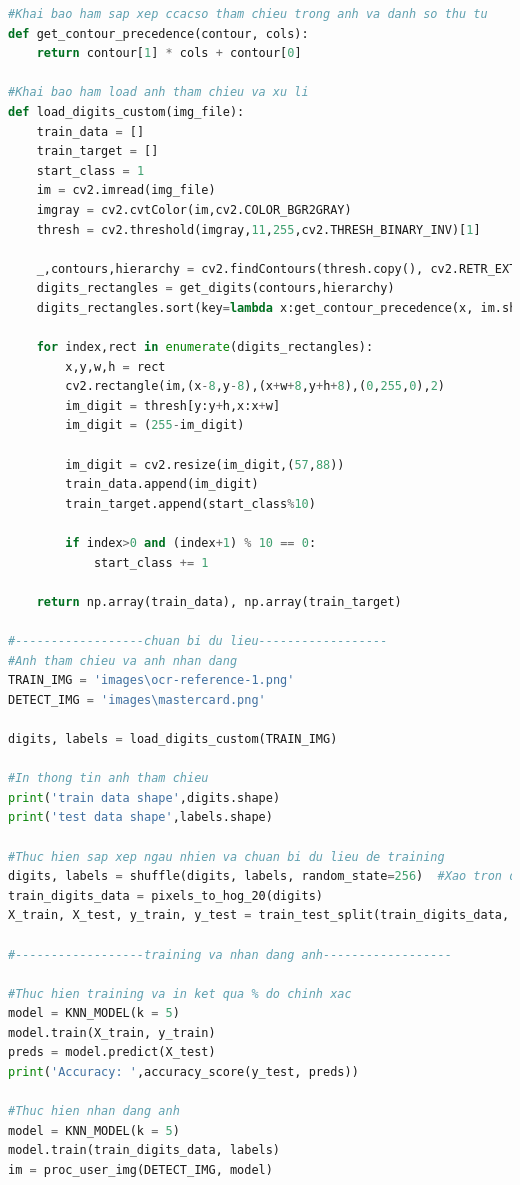 \begin{lstlisting}[language=Python, caption=Recognition Mastercard]
#Khai bao ham sap xep ccacso tham chieu trong anh va danh so thu tu
def get_contour_precedence(contour, cols):
    return contour[1] * cols + contour[0]

#Khai bao ham load anh tham chieu va xu li
def load_digits_custom(img_file):
    train_data = []
    train_target = []
    start_class = 1
    im = cv2.imread(img_file)
    imgray = cv2.cvtColor(im,cv2.COLOR_BGR2GRAY)
    thresh = cv2.threshold(imgray,11,255,cv2.THRESH_BINARY_INV)[1]   
       
    _,contours,hierarchy = cv2.findContours(thresh.copy(), cv2.RETR_EXTERNAL, cv2.CHAIN_APPROX_SIMPLE)
    digits_rectangles = get_digits(contours,hierarchy)  
    digits_rectangles.sort(key=lambda x:get_contour_precedence(x, im.shape[1]))
     
    for index,rect in enumerate(digits_rectangles):
        x,y,w,h = rect
        cv2.rectangle(im,(x-8,y-8),(x+w+8,y+h+8),(0,255,0),2)
        im_digit = thresh[y:y+h,x:x+w]
        im_digit = (255-im_digit)
        
        im_digit = cv2.resize(im_digit,(57,88))
        train_data.append(im_digit)
        train_target.append(start_class%10)

        if index>0 and (index+1) % 10 == 0:
            start_class += 1
    
    return np.array(train_data), np.array(train_target)

#------------------chuan bi du lieu------------------
#Anh tham chieu va anh nhan dang
TRAIN_IMG = 'images\ocr-reference-1.png'
DETECT_IMG = 'images\mastercard.png'

digits, labels = load_digits_custom(TRAIN_IMG)

#In thong tin anh tham chieu
print('train data shape',digits.shape)
print('test data shape',labels.shape)

#Thuc hien sap xep ngau nhien va chuan bi du lieu de training
digits, labels = shuffle(digits, labels, random_state=256)  #Xao tron du lieu
train_digits_data = pixels_to_hog_20(digits)
X_train, X_test, y_train, y_test = train_test_split(train_digits_data, labels, test_size=0.7)

#------------------training va nhan dang anh------------------

#Thuc hien training va in ket qua % do chinh xac
model = KNN_MODEL(k = 5)
model.train(X_train, y_train)
preds = model.predict(X_test)
print('Accuracy: ',accuracy_score(y_test, preds))

#Thuc hien nhan dang anh 
model = KNN_MODEL(k = 5)
model.train(train_digits_data, labels)
im = proc_user_img(DETECT_IMG, model)


\end{lstlisting}
